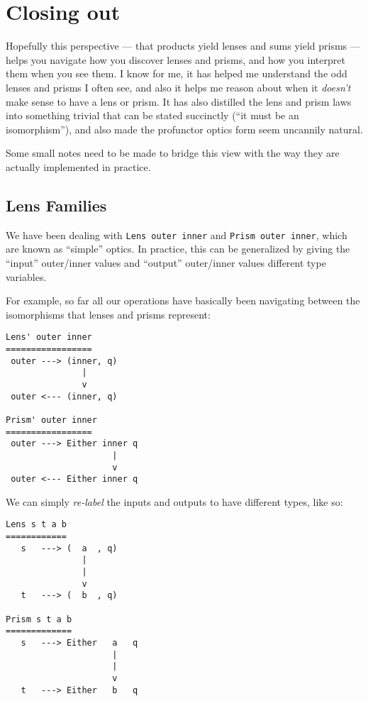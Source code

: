 \documentclass[]{article}
\begin{document}
\hypertarget{closing-out}{%
\section{Closing out}\label{closing-out}}

Hopefully this perspective --- that products yield lenses and sums yield prisms
--- helps you navigate how you discover lenses and prisms, and how you interpret
them when you see them. I know for me, it has helped me understand the odd
lenses and prisms I often see, and also it helps me reason about when it
\emph{doesn't} make sense to have a lens or prism. It has also distilled the
lens and prism laws into something trivial that can be stated succinctly (``it
must be an isomorphism''), and also made the profunctor optics form seem
uncannily natural.

Some small notes need to be made to bridge this view with the way they are
actually implemented in practice.

\hypertarget{lens-families}{%
\subsection{Lens Families}\label{lens-families}}

We have been dealing with \texttt{Lens\textquotesingle{}\ outer\ inner} and
\texttt{Prism\textquotesingle{}\ outer\ inner}, which are known as ``simple''
optics. In practice, this can be generalized by giving the ``input'' outer/inner
values and ``output'' outer/inner values different type variables.

For example, so far all our operations have basically been navigating between
the isomorphisms that lenses and prisms represent:

\begin{verbatim}
Lens' outer inner
=================
 outer ---> (inner, q)
               |
               v
 outer <--- (inner, q)

Prism' outer inner
=================
 outer ---> Either inner q
                     |
                     v
 outer <--- Either inner q
\end{verbatim}

We can simply \emph{re-label} the inputs and outputs to have different types,
like so:

\begin{verbatim}
Lens s t a b
============
   s   ---> (  a  , q)
               |
               |
               v
   t   ---> (  b  , q)

Prism s t a b
=============
   s   ---> Either   a   q
                     |
                     |
                     v
   t   ---> Either   b   q
\end{verbatim}
\end{document}
